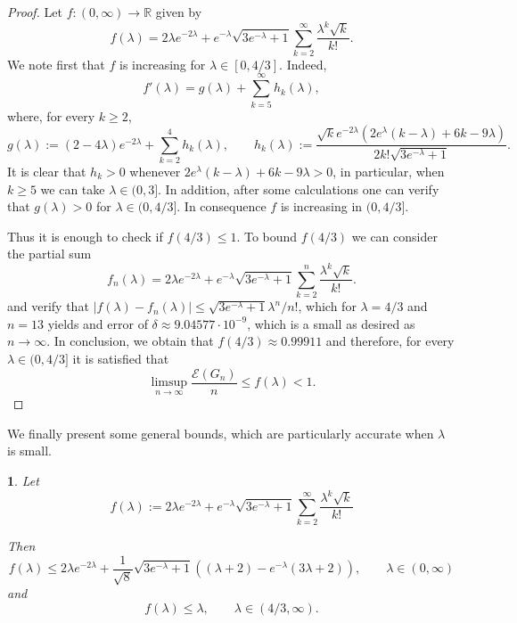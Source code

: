 \documentclass[a4paper]{article}
\newcommand{\R}{\mathbb{R}}
\newcommand{\energy}[1]{\mathcal{E}\left(#1\right)}
\theoremstyle{plain}
\newtheorem{proposition}{\protect\propname}
\renewcommand{\propname}{Proposition}
\renewcommand{\propname}{Proposici\'on}
\begin{document}
\begin{proof}
Let $f : (0,\infty) \to \R$ given by
\[
    f(\lambda) = 2\lambda e^{-2\lambda} + e^{-\lambda}\sqrt{3e^{-\lambda} + 1}\sum_{k = 2}^{\infty} \frac{\lambda^k\sqrt{k}}{k!}.
\]
We note first that $f$ is increasing for $\lambda \in [0,4/3]$. Indeed,
\[
    f'(\lambda) = g(\lambda) + \sum_{k = 5}^{\infty} h_k(\lambda),
\]
where, for every \(k \geq 2\),
\[
    g(\lambda) := (2 - 4\lambda)e^{-2\lambda} + \sum_{k = 2}^4 h_k(\lambda), \qquad h_k(\lambda) := \frac{\sqrt{k}e^{-2\lambda}\left(2e^{\lambda}(k - \lambda) + 6k - 9\lambda\right)}{2k!\sqrt{3e^{-\lambda} + 1}}.
\]
It is clear that \(h_k > 0\) whenever \(2e^{\lambda}(k - \lambda) + 6k - 9\lambda > 0\), in particular, when $k\geq 5$ we can take  \(\lambda \in (0,3]\). In addition, after some calculations one can verify that \(g(\lambda) > 0\) for \(\lambda \in (0,4/3]\). In consequence \(f\) is increasing in \((0,4/3]\).

Thus it is enough to check if $f(4/3)\leq 1$.  To bound $f(4/3)$ we can consider the partial sum \[
    f_n(\lambda) = 2\lambda e^{-2\lambda} + e^{-\lambda}\sqrt{3e^{-\lambda} + 1}\sum_{k = 2}^{n} \frac{\lambda^k\sqrt{k}}{k!}.
\]
and verify that $|f(\lambda)-f_n(\lambda)|\leq\sqrt{3e^{-\lambda} + 1}\lambda^n/n!$, which for $\lambda=4/3$ and $n = 13$ yields and error of $\delta \approx 9.04577\cdot 10^{-9}$, which is a small as desired as $n\to \infty$.
In conclusion, we obtain that \(f(4/3) \approx 0.99911\) and therefore, for every \(\lambda \in (0,4/3]\) it is satisfied that
\[
    \limsup_{n \to \infty} \frac{\energy{G_n}}{n} \leq f(\lambda) < 1.
\]

\end{proof}

We finally present some general bounds, which are particularly accurate when $\lambda$ is small.

\begin{proposition}\label{ER-bound2}
 Let 
\begin{equation*}
   f(\lambda) := 2\lambda e^{-2\lambda} + e^{-\lambda}\sqrt{3e^{-\lambda} + 1}\sum_{k = 2}^{\infty} \frac{\lambda^k\sqrt{k}}{k!}
\end{equation*}

Then
\[
    f(\lambda) \leq 2\lambda e^{-2\lambda} + \frac{1}{\sqrt{8}}\sqrt{3e^{-\lambda} + 1}\left((\lambda + 2) - e^{-\lambda}(3\lambda + 2)\right), \qquad \lambda \in (0,\infty)
\]
and
\[
    f(\lambda) \leq \lambda, \qquad \lambda \in (4/3,\infty).
\]
\end{proposition}
\end{document}
